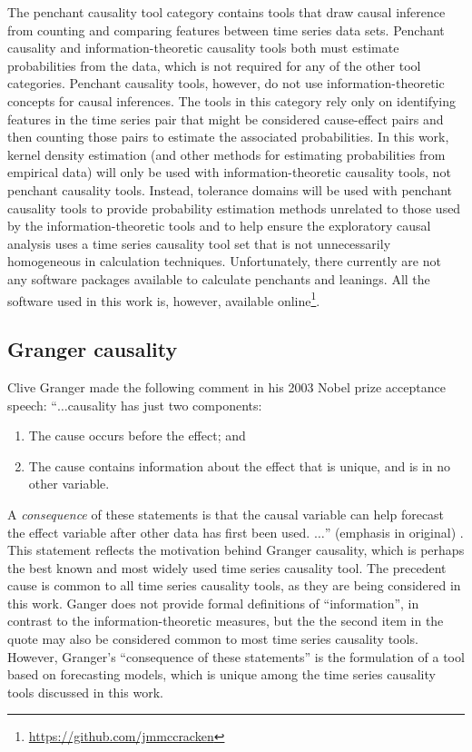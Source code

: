\documentclass{article}[10pt]
\begin{document}
The penchant causality tool category contains tools that draw causal inference from counting  and comparing features between time series data sets.  Penchant causality and information-theoretic causality tools both must estimate probabilities from the data, which is not required for any of the other tool categories.  Penchant causality tools, however, do not use information-theoretic concepts for causal inferences.  The tools in this category rely only on identifying features in the time series pair that might be considered cause-effect pairs and then counting those pairs to estimate the associated probabilities.  In this work, kernel density estimation \cite{Kaiser2002} (and other methods for estimating probabilities from empirical data) will only be used with information-theoretic causality tools, not penchant causality tools.  Instead, tolerance domains will be used with penchant causality tools to provide probability estimation methods unrelated to those used by the information-theoretic tools and to help ensure the exploratory causal analysis uses a time series causality tool set that is not unnecessarily homogeneous in calculation techniques.  Unfortunately, there currently are not any software packages available to calculate penchants and leanings.  All the software used in this work is, however, available online\footnote{\url{https://github.com/jmmccracken}}.

\subsection{Granger causality}
\label{sec:GC}
Clive Granger made the following comment in his 2003 Nobel prize acceptance speech:
``$\ldots$causality has just two components:
\begin{enumerate}
\item The cause occurs before the effect; and
\item The cause contains information about the effect that is unique, and is in no other variable.
\end{enumerate}
A {\em consequence} of these statements is that the causal variable can help forecast the effect variable after other data has first been used. $\ldots$'' (emphasis in original) \cite{Granger2003}.  This statement reflects the motivation behind Granger causality, which is perhaps the best known and most widely used time series causality tool.  The precedent cause is common to all time series causality tools, as they are being considered in this work.  Ganger does not provide formal definitions of ``information'', in contrast to the information-theoretic measures, but the the second item in the quote may also be considered common to most time series causality tools.  However, Granger's ``consequence of these statements'' is the formulation of a tool based on forecasting models, which is unique among the time series causality tools discussed in this work.  
\end{document}
